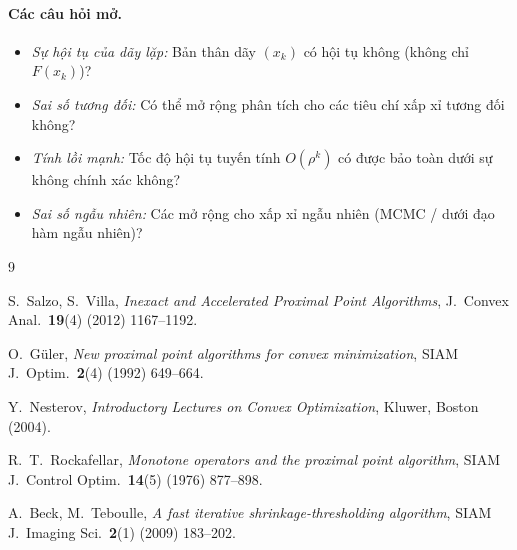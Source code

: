 \documentclass[12pt, a4paper]{article}
\begin{document}
\paragraph{Các câu hỏi mở.}
\begin{itemize}
  \item \emph{Sự hội tụ của dãy lặp:} Bản thân dãy $(x_k)$ có hội tụ không (không chỉ $F(x_k)$)?
  \item \emph{Sai số tương đối:} Có thể mở rộng phân tích cho các tiêu chí xấp xỉ tương đối không?
  \item \emph{Tính lồi mạnh:} Tốc độ hội tụ tuyến tính $O(\rho^k)$ có được bảo toàn dưới sự không chính xác không?
  \item \emph{Sai số ngẫu nhiên:} Các mở rộng cho xấp xỉ ngẫu nhiên (MCMC / dưới đạo hàm ngẫu nhiên)?
\end{itemize}

\begin{thebibliography}{9}

S.~Salzo, S.~Villa,
\textit{Inexact and Accelerated Proximal Point Algorithms},
J.\ Convex Anal.\ \textbf{19}(4) (2012) 1167--1192.

O.~G\"{u}ler,
\textit{New proximal point algorithms for convex minimization},
SIAM J.\ Optim.\ \textbf{2}(4) (1992) 649--664.

Y.~Nesterov,
\textit{Introductory Lectures on Convex Optimization},
Kluwer, Boston (2004).

R.~T.~Rockafellar,
\textit{Monotone operators and the proximal point algorithm},
SIAM J.\ Control Optim.\ \textbf{14}(5) (1976) 877--898.

A.~Beck, M.~Teboulle,
\textit{A fast iterative shrinkage-thresholding algorithm},
SIAM J.\ Imaging Sci.\ \textbf{2}(1) (2009) 183--202.

\end{thebibliography}
\end{document}
